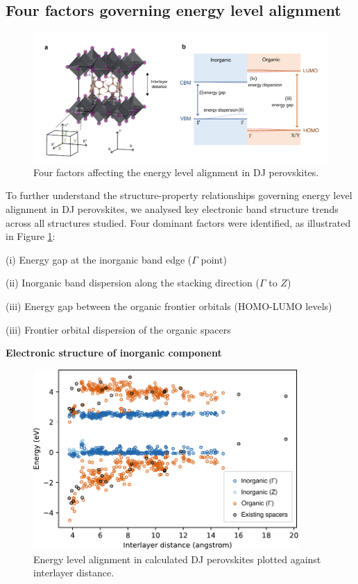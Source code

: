 \subsection{Four factors governing energy level alignment}

\begin{figure}[htbp]
    \centering
    \includegraphics[width=\textwidth]{figures/HT-ML/figure4-6.pdf}
    \caption{Four factors affecting the energy level alignment in DJ perovskites.}
    \label{fig:figure4.6}
\end{figure}

To further understand the structure-property relationships governing energy level alignment in DJ perovskites, we analysed key electronic band structure trends across all structures studied. Four dominant factors were identified, as illustrated in Figure \ref{fig:figure4.6}:

(i) Energy gap at the inorganic band edge ($\Gamma$ point)

(ii) Inorganic band dispersion along the stacking direction ($\Gamma$ to $Z$)

(iii) Energy gap between the organic frontier orbitals (HOMO-LUMO levels)

(iii) Frontier orbital dispersion of the organic spacers

\textbf{Electronic structure of inorganic component}

\begin{figure}[htbp]
    \centering
    \includegraphics[width=0.9\textwidth]{figures/HT-ML/figure4-7.pdf}
    \caption{Energy level alignment in calculated DJ perovskites plotted against interlayer distance.}
    \label{fig:figure4.7}
\end{figure}

